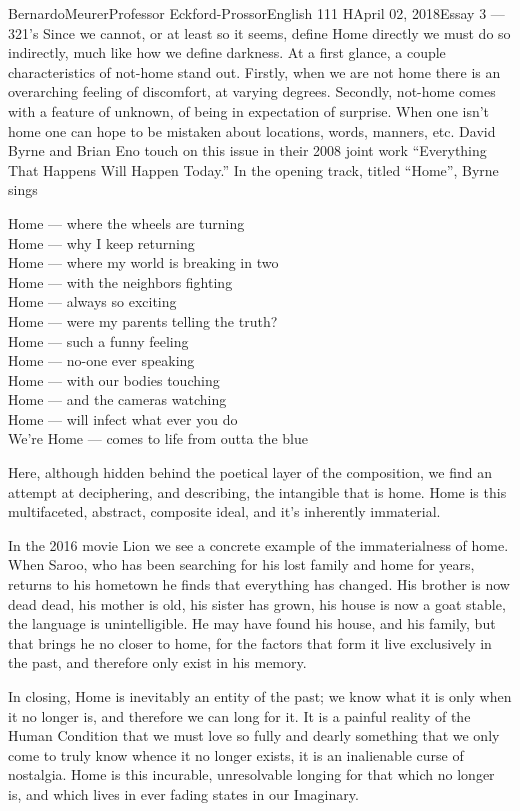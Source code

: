 \documentclass[12pt,letterpaper]{article}
\begin{document}
\begin{mla}{Bernardo}{Meurer}{Professor Eckford-Prossor}{English 111 H}{April 02, 2018}{Essay 3 --- 321's}
    Since we cannot, or at least so it seems, define Home directly we must do so indirectly, much like how we define darkness. At a first glance, a couple characteristics of not-home stand out. Firstly, when we are not home there is an overarching feeling of discomfort, at varying degrees. Secondly, not-home comes with a feature of unknown, of being in expectation of surprise. When one isn't home one can hope to be mistaken about locations, words, manners, etc.
David Byrne and Brian Eno touch on this issue in their 2008 joint work ``Everything That Happens Will Happen Today.'' In the opening track, titled ``Home'', Byrne sings
\begin{blocks}
Home --- where the wheels are turning\\
Home --- why I keep returning\\
Home --- where my world is breaking in two\\
Home --- with the neighbors fighting\\
Home --- always so exciting\\
Home --- were my parents telling the truth?\\
Home --- such a funny feeling\\
Home --- no-one ever speaking\\
Home --- with our bodies touching\\
Home --- and the cameras watching\\
Home --- will infect what ever you do\\
We're Home --- comes to life from outta the blue\\
\end{blocks}
Here, although hidden behind the poetical layer of the composition, we find an attempt at deciphering, and describing, the intangible that is home. Home is this multifaceted, abstract, composite ideal, and it's inherently immaterial.

In the 2016 movie Lion we see a concrete example of the immaterialness of home. When Saroo, who has been searching for his lost family and home for years, returns to his hometown he finds that everything has changed. His brother is now dead dead, his mother is old, his sister has grown, his house is now a goat stable, the language is unintelligible.
He may have found his house, and his family, but that brings he no closer to home, for the factors that form it live exclusively in the past, and therefore only exist in his memory.

In closing, Home is inevitably an entity of the past; we know what it is only when it no longer is, and therefore we can long for it. It is a painful reality of the Human Condition that we must love so fully and dearly something that we only come to truly know whence it no longer exists, it is an inalienable curse of nostalgia. Home is this incurable, unresolvable longing for that which no longer is, and which lives in ever fading states in our Imaginary.
\end{mla}
\end{document}
